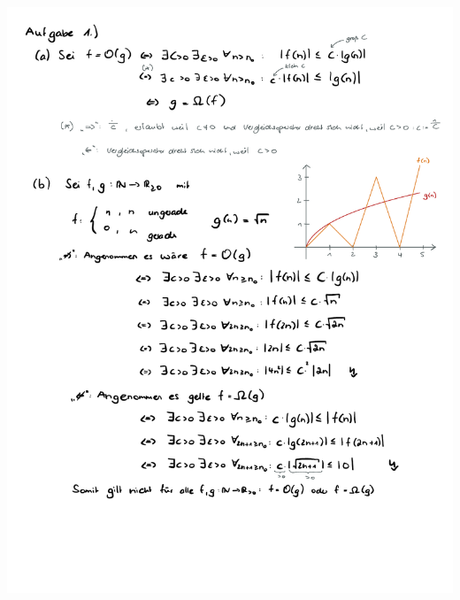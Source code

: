 \documentclass[a4paper,oneside,11pt]{scrartcl}
\begin{document}
\begin{minipage}[t]{\textwidth}
\includegraphics[scale = 0.75, page=2]{AlMa1_Zettel04.pdf}
\end{minipage}
\pagebreak
\end{document}
